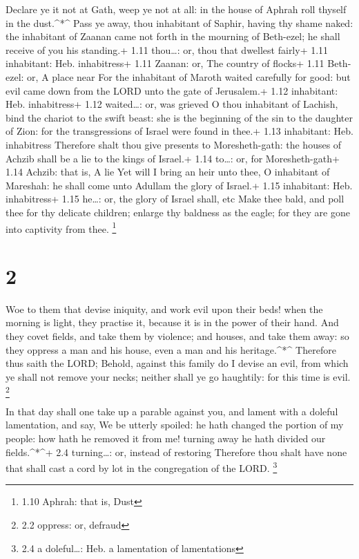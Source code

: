  Declare ye it not at Gath, weep ye not at all: in the
house of Aphrah roll thyself in the dust.\^{}*\^{}  Pass ye
away, thou inhabitant of Saphir, having thy shame naked: the inhabitant
of Zaanan came not forth in the mourning of Beth-ezel; he shall receive
of you his standing.+ 1.11 thou\ldots: or, thou that dwellest fairly+
1.11 inhabitant: Heb. inhabitress+ 1.11 Zaanan: or, The country of
flocks+ 1.11 Beth-ezel: or, A place near  For the
inhabitant of Maroth waited carefully for good: but evil came down from
the LORD unto the gate of Jerusalem.+ 1.12 inhabitant: Heb. inhabitress+
1.12 waited\ldots: or, was grieved  O thou inhabitant of
Lachish, bind the chariot to the swift beast: she is the beginning of
the sin to the daughter of Zion: for the transgressions of Israel were
found in thee.+ 1.13 inhabitant: Heb. inhabitress 
Therefore shalt thou give presents to Moresheth-gath: the houses of
Achzib shall be a lie to the kings of Israel.+ 1.14 to\ldots: or, for
Moresheth-gath+ 1.14 Achzib: that is, A lie  Yet will I
bring an heir unto thee, O inhabitant of Mareshah: he shall come unto
Adullam the glory of Israel.+ 1.15 inhabitant: Heb. inhabitress+ 1.15
he\ldots: or, the glory of Israel shall, etc  Make thee
bald, and poll thee for thy delicate children; enlarge thy baldness as
the eagle; for they are gone into captivity from thee. \footnote{1.10
  Aphrah: that is, Dust}

\hypertarget{section-1}{%
\section{2}\label{section-1}}

 Woe to them that devise iniquity, and work evil upon their
beds! when the morning is light, they practise it, because it is in the
power of their hand.  And they covet fields, and take them
by violence; and houses, and take them away: so they oppress a man and
his house, even a man and his heritage.\^{}*\^{}  Therefore
thus saith the LORD; Behold, against this family do I devise an evil,
from which ye shall not remove your necks; neither shall ye go
haughtily: for this time is evil. \footnote{2.2 oppress: or, defraud}

 In that day shall one take up a parable against you, and
lament with a doleful lamentation, and say, We be utterly spoiled: he
hath changed the portion of my people: how hath he removed it from me!
turning away he hath divided our fields.\^{}*\^{}+ 2.4 turning\ldots:
or, instead of restoring  Therefore thou shalt have none
that shall cast a cord by lot in the congregation of the LORD.
\footnote{2.4 a doleful\ldots: Heb. a lamentation of lamentations}

